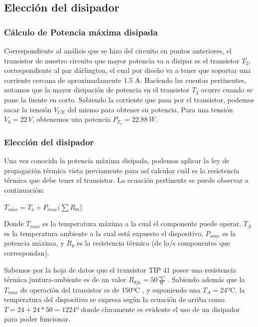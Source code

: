 \documentclass[e2_tp1_main.tex]{subfiles}
\begin{document}
\subsection{Elección del disipador}

\subsubsection{Cálculo de Potencia máxima disipada }

Correspondiente al análisis que se hizo del circuito en puntos anteriores,
el transistor de nuestro circuito que mayor potencia va a disipar
es el transistor $T_{2}$, correspondiente al par dárlington, el cual
por diseño va a tener que soportar una corriente cercana de aproximadamente
1.5 A. Haciendo las cuentas pertinentes, notamos que la mayor disipación
de potencia en el transistor $T_{2}$ ocurre cuando se pone la fuente
en corto. Sabiendo la corriente que pasa por el transistor, podemos
sacar la tensión $V_{CE}$ del mismo para obtener su potencia. Para
una tensión $V_{0}=22\,V$, obtenemos una potencia $P_{T_{2}}=22.88\,W$.

\subsubsection{Elección del disipador}

Una vez conocida la potencia máxima disipada, podemos aplicar la ley
de propagación térmica vista previamente para así calcular cuál es
la resistencia térmica que debe tener el transistor. La ecuación pertinente
se puede observar a continuación:
\begin{center}
{\large{}$T_{m\acute{a}x}=T_{a}+P_{max}(\sum R_{\theta i}$)}{\large\par}
\par\end{center}

Donde $T_{max}$ es la temperatura máxima a la cual el componente
puede operar, $T_{A}$ es la temperatura ambiente a la cual está expuesto
el dispositivo, $P_{max}$ es la potencia máxima, y $R_{\theta}$
es la resistencia térmica (de lo/s componentes que correspondan).

Sabemos por la hoja de datos que el transistor TIP 41 posee una resistencia
térmica juntura-ambiente es de un valor $R_{\theta ja}=50\,\frac{\text{ºC}}{W}$
. Sabiendo además que la $T_{max}$ de operación del transistor es
de 150ºC , y suponiendo una $T_{A}=24\text{ºC}$, la temperatura del
dispositivo se expresa según la ecuación de arriba como $T=24+24*50=1224\text{º}$
donde claramente es evidente el uso de un disipador para poder funcionar.
\end{document}
